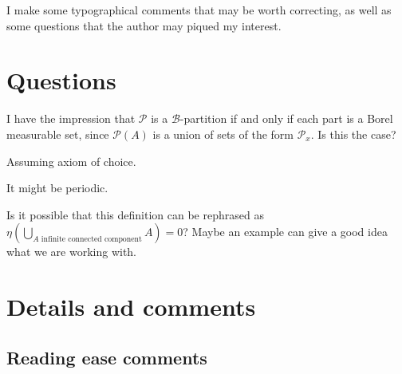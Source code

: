 \documentclass[12pt]{article}
\begin{document}
I make some typographical comments that may be worth correcting, as well as some questions that the author may piqued my interest.

\section*{Questions}

\begin{itemize}
 I have the impression that $\mathcal P$ is a $\mathcal B$-partition if and only if each part is a Borel measurable set, since $\mathcal P(A)$ is a union of sets of the form $\mathcal P_x$. Is this the case?

Assuming axiom of choice.

It might be periodic.


Is it possible that this definition can be rephrased as $\eta(\bigcup_{A \text{ infinite connected component}} A) = 0$? Maybe an example can give a good idea what we are working with.



\end{itemize}


\section*{Details and comments}


\subsection*{Reading ease comments}
\end{document}
